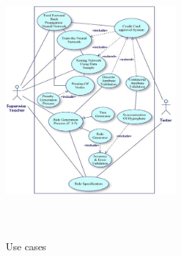 \documentclass[a4paper,14pt,onecolumn]{article}
\begin{document}
\begin{figure}[h!]
\begin{center}
\includegraphics[height=4in,width=2.5in]
{UseCaseForReport.jpg} 
\caption{Use cases}
\end{center}
\end{figure}
\newpage
\end{document}
